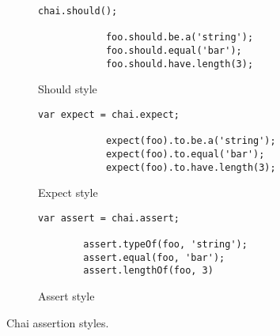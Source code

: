 \newcommand{\assertionwidth}{0.328\textwidth}
\newcommand{\assertionsize}{\tiny}
\begin{figure}[H]
	\centering
	\begin{subfigure}[b]{\assertionwidth}
        \begin{lstlisting}[basicstyle=\assertionsize]
			chai.should();

			foo.should.be.a('string');
			foo.should.equal('bar');
			foo.should.have.length(3);
		\end{lstlisting}
        \caption{Should style}
        \label{fig:should_style}
    \end{subfigure}
    \begin{subfigure}[b]{\assertionwidth}
		\begin{lstlisting}[basicstyle=\assertionsize]
			var expect = chai.expect;
				
			expect(foo).to.be.a('string');
			expect(foo).to.equal('bar');
			expect(foo).to.have.length(3);
		\end{lstlisting}
        \caption{Expect style}
        \label{fig:expect_style}
    \end{subfigure}
    \begin{subfigure}[b]{\assertionwidth}
		\begin{lstlisting}[basicstyle=\assertionsize]
        var assert = chai.assert;

		assert.typeOf(foo, 'string');
		assert.equal(foo, 'bar');
		assert.lengthOf(foo, 3)
		\end{lstlisting}
        \caption{Assert style}
        \label{fig:assert_style}
    \end{subfigure}
	\caption[Chai assertions]{Chai assertion styles.}
	\label{fig:chai_assertions}
\end{figure}
